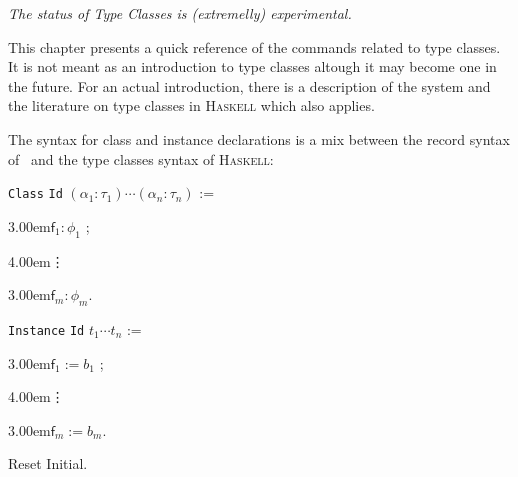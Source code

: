\def\Haskell{\textsc{Haskell}\xspace}
\def\eol{\setlength\parskip{0pt}\par}
\def\indent#1{\noindent\kern#1}
\def\cst#1{\textsf{#1}}

\label{typeclasses}

\begin{flushleft}
  \em The status of Type Classes is (extremelly) experimental.
\end{flushleft}

This chapter presents a quick reference of the commands related to type
classes. It is not meant as an introduction to type classes altough it
may become one in the future. For an actual introduction, there is a
description of the system \cite{sozeau08} and the literature on type
classes in \Haskell which also applies.


The syntax for class and instance declarations is a mix between the
record syntax of \Coq~and the type classes syntax of \Haskell:
\def\kw{\texttt}
\def\classid{\texttt}

\begin{multicols}{2}{
\medskip
  \kw{Class} \classid{Id} $(\alpha_1 : \tau_1) \cdots (\alpha_n : \tau_n)$ :=
  \eol\indent{3.00em}$\cst{f}_1 : \phi_1$ ;
  \eol\indent{4.00em}\vdots
  \eol\indent{3.00em}$\cst{f}_m : \phi_m$.
\medskip}
{
  
  \medskip
  \kw{Instance} \classid{Id} $t_1 \cdots t_n$ :=
  \eol\indent{3.00em}$\cst{f}_1 := b_1$ ;
  \eol\indent{4.00em}\vdots
  \eol\indent{3.00em}$\cst{f}_m := b_m$.
  \medskip}
\end{multicols}

\begin{coq_eval}
  Reset Initial.
\end{coq_eval}

